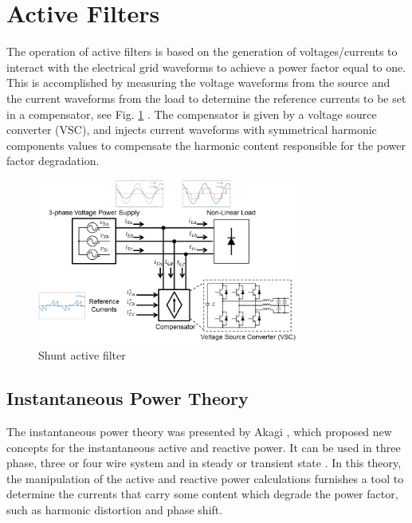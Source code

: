 \section{Active Filters}

The operation of active filters is based on the generation of voltages/currents to interact with the electrical grid waveforms to achieve a power factor equal to one. This is accomplished by measuring the voltage waveforms from the source and the current waveforms from the load to determine the reference currents to be set in a compensator, see Fig. \ref{fig:compensador.png} \citep{Akagi2006}. The compensator is given by a voltage source converter (VSC), and injects current waveforms with symmetrical harmonic components values to compensate the harmonic content responsible for the power factor degradation.

\begin{figure}[!h]
\centering
\includegraphics[width=0.78\textwidth]{Figures/compensador.png}
\caption{Shunt active filter}
\label{fig:compensador.png}
\end{figure}



\subsection{Instantaneous Power Theory}

The instantaneous power theory was presented by Akagi \citep{Akagi1984}, which proposed new concepts for the instantaneous active and reactive power. It can be used in three phase, three or four wire system and in steady or transient state \citep{Akagi2007}. In this theory, the manipulation of the active and reactive power calculations furnishes a tool to determine the currents that carry some content which degrade the power factor, such as harmonic distortion and phase shift.

